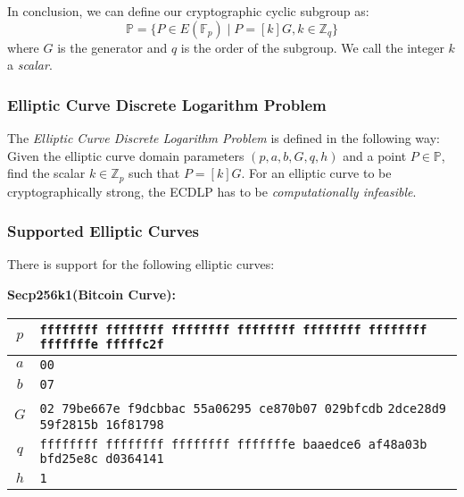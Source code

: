 In conclusion, we can define our cryptographic cyclic subgroup as:
\[ \mathbb{P} = \{ P \in E(\mathbb{F}_p) \mid P = [k]G, k \in \mathbb{Z}_q \} \]
where $G$ is the generator and $q$ is the order of the subgroup. We call the integer $k$ a \textit{scalar}.


\subsubsection{Elliptic Curve Discrete Logarithm Problem} \label{app: elliptic curve discrete logarithm problem}
The \textit{Elliptic Curve Discrete Logarithm Problem} is defined in \cite{Trappe05} the following way: Given the elliptic curve domain parameters $(p, a, b, G, q, h)$ and a point $P \in \mathbb{P}$, find the scalar $k \in \mathbb{Z}_p$ such that $P = [k]G$. For an elliptic curve to be cryptographically strong, the ECDLP has to be \textit{computationally infeasible}.


\subsubsection{Supported Elliptic Curves} \label{app: supported elliptic curves}
There is support for the following elliptic curves:

\textbf{Secp256k1(Bitcoin Curve):}
\begin{center}
\begin{tabular}{|c|p{9.8cm}|} \hline
    $p$ &   \texttt{ffffffff ffffffff ffffffff ffffffff ffffffff ffffffff} \newline
    \texttt{fffffffe fffffc2f} \\ \hline
    $a$ &   \texttt{\phantom{000000}00} \\ \hline
    $b$ &   \texttt{\phantom{000000}07} \\ \hline
    $G$ &   \texttt{\phantom{000000}02 79be667e f9dcbbac 55a06295 ce870b07 029bfcdb} \newline
    \texttt{2dce28d9 59f2815b 16f81798} \\ \hline
    $q$ &   \texttt{ffffffff ffffffff ffffffff fffffffe baaedce6 af48a03b} \newline
    \texttt{bfd25e8c d0364141} \\ \hline
    $h$ & \texttt{1} \\ \hline
\end{tabular}    
\end{center} 

